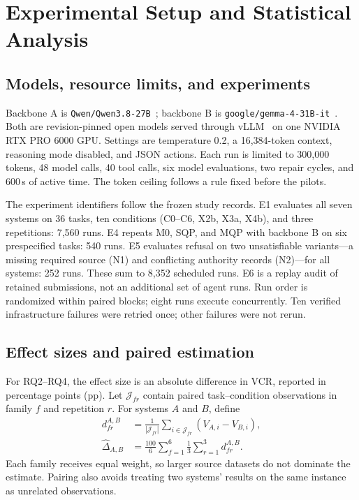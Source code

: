 \documentclass[conference]{IEEEtran}
\newcommand{\sys}[1]{\textsf{#1}}
\newcommand{\code}[1]{\texttt{#1}}
\begin{document}
\section{Experimental Setup and Statistical Analysis}
\label{sec:setup}
\subsection{Models, resource limits, and experiments}
Backbone A is \code{Qwen/Qwen3.8-27B}~\cite{qwen2026qwen38}; backbone B is \code{google/gemma-4-31B-it}~\cite{google2026gemma4}. Both are revision-pinned open models served through vLLM~\cite{kwon2023vllm} on one NVIDIA RTX PRO 6000 GPU. Settings are temperature 0.2, a 16,384-token context, reasoning mode disabled, and JSON actions. Each run is limited to 300,000 tokens, 48 model calls, 40 tool calls, six model evaluations, two repair cycles, and 600\,s of active time. The token ceiling follows a rule fixed before the pilots.

The experiment identifiers follow the frozen study records. E1 evaluates all seven systems on 36 tasks, ten conditions (C0--C6, X2b, X3a, X4b), and three repetitions: 7,560 runs. E4 repeats \sys{M0}, \sys{SQP}, and \sys{MQP} with backbone B on six prespecified tasks: 540 runs. E5 evaluates refusal on two unsatisfiable variants---a missing required source (N1) and conflicting authority records (N2)---for all systems: 252 runs. These sum to 8,352 scheduled runs. E6 is a replay audit of retained submissions, not an additional set of agent runs. Run order is randomized within paired blocks; eight runs execute concurrently. Ten verified infrastructure failures were retried once; other failures were not rerun.

\subsection{Effect sizes and paired estimation}
For RQ2--RQ4, the effect size is an absolute difference in VCR, reported in percentage points (pp). Let $\mathcal{J}_{fr}$ contain paired task--condition observations in family $f$ and repetition $r$. For systems $A$ and $B$, define
\begin{align}
d_{fr}^{A,B}&=\frac{1}{|\mathcal{J}_{fr}|}\sum_{i\in\mathcal{J}_{fr}}(V_{A,i}-V_{B,i}),\\
\widehat{\Delta}_{A,B}&=\frac{100}{6}\sum_{f=1}^{6}\frac{1}{3}\sum_{r=1}^{3}d_{fr}^{A,B}.
\label{eq:estimator}
\end{align}
Each family receives equal weight, so larger source datasets do not dominate the estimate. Pairing also avoids treating two systems' results on the same instance as unrelated observations.
\end{document}
